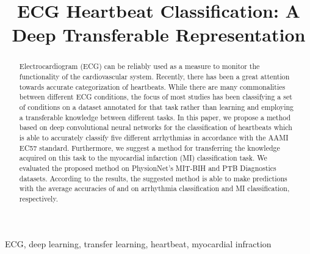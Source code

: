 \documentclass[10pt, conference, compsocconf]{IEEEtran}
\begin{document}
\title{
ECG Heartbeat Classification: A Deep Transferable Representation
}







\author{
}













\maketitle

\begin{abstract}



Electrocardiogram (ECG) can be reliably used as a measure to monitor the functionality of the cardiovascular system. Recently, there has been a great attention towards accurate categorization of heartbeats. While there are many commonalities between different ECG conditions, the focus of most studies has been classifying a set of conditions on a dataset annotated for that task rather than learning and employing a transferable knowledge between different tasks. In this paper, we propose a method based on deep convolutional neural networks for the classification of heartbeats which is able to accurately classify five different arrhythmias in accordance with the AAMI EC57 standard. Furthermore, we suggest a method for transferring the knowledge acquired on this task to the myocardial infarction (MI) classification task. We evaluated the proposed method on PhysionNet's MIT-BIH and PTB Diagnostics datasets. According to the results, the suggested method is able to make predictions with the average accuracies of  and  on arrhythmia classification and MI classification, respectively.
\end{abstract}

\begin{IEEEkeywords}
ECG, deep learning, transfer learning, heartbeat, myocardial infraction 
\end{IEEEkeywords}
\end{document}
